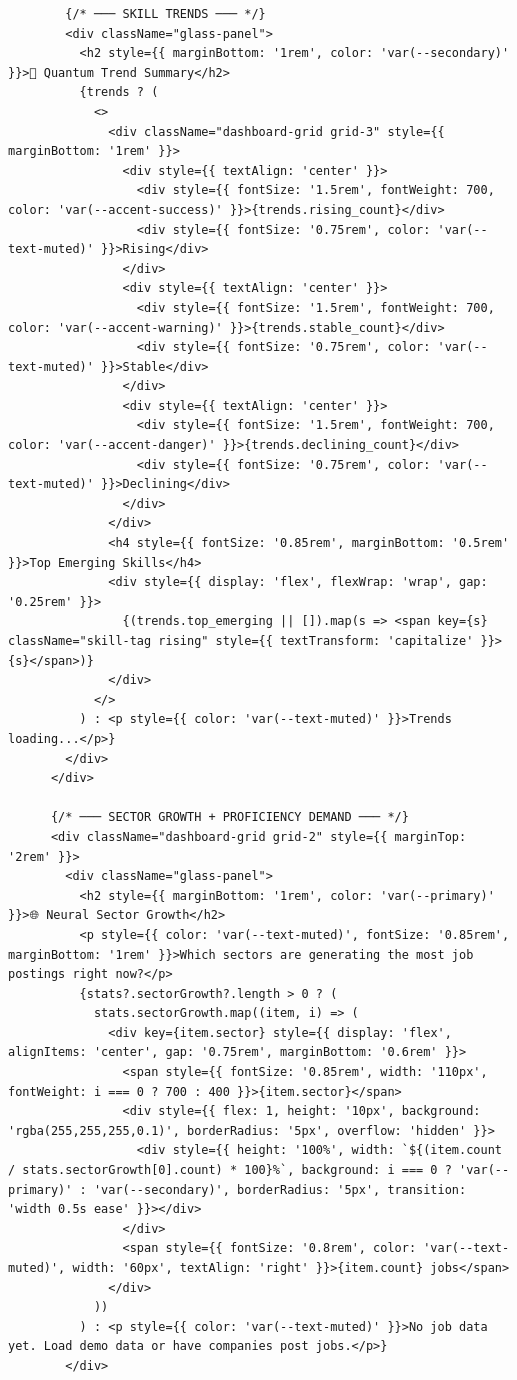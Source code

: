 \documentclass[12pt,a4paper]{report}
\begin{document}
\begin{verbatim}
        {/* ─── SKILL TRENDS ─── */}
        <div className="glass-panel">
          <h2 style={{ marginBottom: '1rem', color: 'var(--secondary)' }}>🚀 Quantum Trend Summary</h2>
          {trends ? (
            <>
              <div className="dashboard-grid grid-3" style={{ marginBottom: '1rem' }}>
                <div style={{ textAlign: 'center' }}>
                  <div style={{ fontSize: '1.5rem', fontWeight: 700, color: 'var(--accent-success)' }}>{trends.rising_count}</div>
                  <div style={{ fontSize: '0.75rem', color: 'var(--text-muted)' }}>Rising</div>
                </div>
                <div style={{ textAlign: 'center' }}>
                  <div style={{ fontSize: '1.5rem', fontWeight: 700, color: 'var(--accent-warning)' }}>{trends.stable_count}</div>
                  <div style={{ fontSize: '0.75rem', color: 'var(--text-muted)' }}>Stable</div>
                </div>
                <div style={{ textAlign: 'center' }}>
                  <div style={{ fontSize: '1.5rem', fontWeight: 700, color: 'var(--accent-danger)' }}>{trends.declining_count}</div>
                  <div style={{ fontSize: '0.75rem', color: 'var(--text-muted)' }}>Declining</div>
                </div>
              </div>
              <h4 style={{ fontSize: '0.85rem', marginBottom: '0.5rem' }}>Top Emerging Skills</h4>
              <div style={{ display: 'flex', flexWrap: 'wrap', gap: '0.25rem' }}>
                {(trends.top_emerging || []).map(s => <span key={s} className="skill-tag rising" style={{ textTransform: 'capitalize' }}>{s}</span>)}
              </div>
            </>
          ) : <p style={{ color: 'var(--text-muted)' }}>Trends loading...</p>}
        </div>
      </div>

      {/* ─── SECTOR GROWTH + PROFICIENCY DEMAND ─── */}
      <div className="dashboard-grid grid-2" style={{ marginTop: '2rem' }}>
        <div className="glass-panel">
          <h2 style={{ marginBottom: '1rem', color: 'var(--primary)' }}>🌐 Neural Sector Growth</h2>
          <p style={{ color: 'var(--text-muted)', fontSize: '0.85rem', marginBottom: '1rem' }}>Which sectors are generating the most job postings right now?</p>
          {stats?.sectorGrowth?.length > 0 ? (
            stats.sectorGrowth.map((item, i) => (
              <div key={item.sector} style={{ display: 'flex', alignItems: 'center', gap: '0.75rem', marginBottom: '0.6rem' }}>
                <span style={{ fontSize: '0.85rem', width: '110px', fontWeight: i === 0 ? 700 : 400 }}>{item.sector}</span>
                <div style={{ flex: 1, height: '10px', background: 'rgba(255,255,255,0.1)', borderRadius: '5px', overflow: 'hidden' }}>
                  <div style={{ height: '100%', width: `${(item.count / stats.sectorGrowth[0].count) * 100}%`, background: i === 0 ? 'var(--primary)' : 'var(--secondary)', borderRadius: '5px', transition: 'width 0.5s ease' }}></div>
                </div>
                <span style={{ fontSize: '0.8rem', color: 'var(--text-muted)', width: '60px', textAlign: 'right' }}>{item.count} jobs</span>
              </div>
            ))
          ) : <p style={{ color: 'var(--text-muted)' }}>No job data yet. Load demo data or have companies post jobs.</p>}
        </div>


\end{verbatim}
\end{document}
